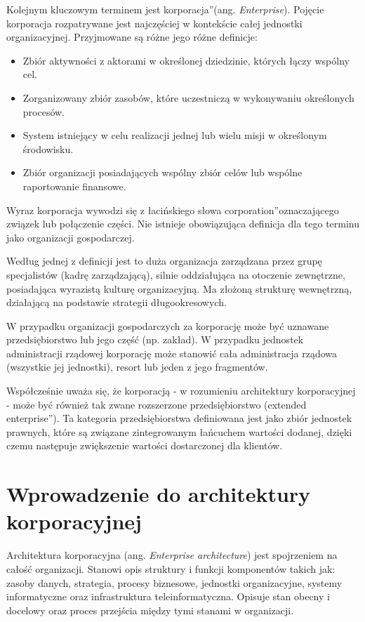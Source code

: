 Kolejnym kluczowym terminem jest \quotedblbase korporacja\textquotedblright (ang. \textit{Enterprise}). Pojęcie korporacja rozpatrywane jest najczęściej w kontekście całej jednostki organizacyjnej. Przyjmowane są różne jego różne definicje:
\begin{itemize}
\item{Zbiór aktywności z aktorami w określonej dziedzinie, których łączy wspólny cel.}
\item{Zorganizowany zbiór zasobów, które uczestniczą w wykonywaniu określonych procesów.}
\item{System istniejący w celu realizacji jednej lub wielu misji w określonym środowisku.}
\item{Zbiór organizacji posiadających wspólny zbiór celów lub wspólne raportowanie finansowe.}
\end{itemize}

Wyraz korporacja wywodzi się z łacińskiego słowa \quotedblbase corporation\textquotedblright oznaczającego związek lub połączenie części. Nie istnieje obowiązująca definicja dla tego terminu jako organizacji gospodarczej. 

Według jednej z definicji jest to duża organizacja zarządzana przez grupę specjalistów (kadrę zarządzającą), silnie oddziałująca na otoczenie zewnętrzne, posiadająca wyrazistą kulturę organizacyjną. Ma złożoną strukturę wewnętrzną, działającą na podstawie strategii długookresowych.

W przypadku organizacji gospodarczych za korporację może być uznawane przedsiębiorstwo lub jego część (np. zakład). W przypadku jednostek administracji rządowej korporację może stanowić cała administracja rządowa (wszystkie jej jednostki), resort lub jeden z jego fragmentów.

Współcześnie uważa się, że korporacją - w rozumieniu architektury korporacyjnej - może być również tak zwane rozszerzone przedsiębiorstwo (\quotedblbase extended enterprise\textquotedblright). Ta kategoria przedsiębiorstwa definiowana jest jako zbiór jednostek prawnych, które są związane zintegrowanym łańcuchem wartości dodanej, dzięki czemu następuje zwiększenie wartości dostarczonej dla klientów. \cite{SobArchKorpDobrPr} 

\section{Wprowadzenie do architektury korporacyjnej}
Architektura korporacyjna (ang. \emph{Enterprise architecture}) jest spojrzeniem na całość organizacji. Stanowi opis struktury i funkcji komponentów takich jak: zasoby danych, strategia, procesy biznesowe, jednostki organizacyjne, systemy informatyczne oraz infrastruktura teleinformatyczna. Opisuje stan obecny i docelowy oraz proces przejścia między tymi stanami w organizacji. \cite{ArchKorpSob}

